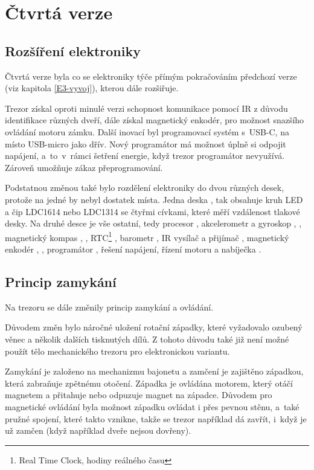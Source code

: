 \section{Čtvrtá verze}
\label{E4-vivoj}

\subsection*{Rozšíření elektroniky}

Čtvrtá verze byla co se elektroniky týče přímým pokračováním předchozí verze (viz kapitola \ref{E3-vyvoj}), kterou dále rozšiřuje.

Trezor získal oproti minulé verzi schopnost komunikace pomocí IR z důvodu identifikace růz\-ných dveří, dále získal magnetický enkodér, pro možnost snaz\-ší\-ho ovládání
motoru zámku. 
Další inovací byl programovací systém s~USB-C, na místo USB-micro jako dřív. Nový programátor má možnost úplně si odpojit napáje\-ní, a~to~v~rámci šetření 
energie, když trezor programátor nevyužívá. 
Zároveň umožňuje zákaz přeprogramování.

Podstatnou změnou také bylo rozdělení elektroniky do dvou různých desek, protože na jedné by nebyl dostatek místa. Jedna deska , 
tak obsahuje kruh LED \parencite{WS2812} a čip LDC1614 \parencite{LDC1614} nebo LDC1314 se čtyřmi cívkami, které měří vzdálenost tlakové desky. Na druhé desce
je vše ostatní, tedy procesor \parencite{ESP32}, akcelerometr a
gyroskop \parencite{bmx055}, \parencite{mpu6050}, magnetický kompas \parencite{bmx055}, \parencite{qmc5883}, RTC\footnote{Real Time Clock, hodiny reálného času} \parencite{m41t62}, 
barometr \parencite{spl06}, IR vysílač \parencite{ir19-21c/tr8} a přijímač \parencite{irm-h936}, magnetický enkodér \parencite{mh253}, \parencite{ss360nt}, programátor \parencite{cp2102},
řešení napájení, řízení motoru a nabíječka \parencite{se9017}. 

\subsection*{Princip zamykání}

Na trezoru se dále změnily princip zamykání a ovládání. 

Důvodem změn bylo náročné uložení rotační západky, 
které vyžadovalo ozubený věnec a několik dalších tisknutých dílů.
Z tohoto důvodu také již není možné použít tělo mechanického trezoru pro elektronickou variantu.

Zamykání je založeno na mechanizmu bajonetu a zamčení je zajištěno západ\-kou, která zabraňuje zpětnému otočení.
Západka je ovládána motorem, který otáčí magnetem a přitahuje nebo odpuzuje magnet na západce. Důvodem pro magnetické ovládání
byla možnost západku ovládat i přes pevnou stěnu, a~také pružné spojení, které takto vznikne, takže se trezor například dá zavřít, i~když
je už zamčen (když například dveře nejsou dovřeny).

